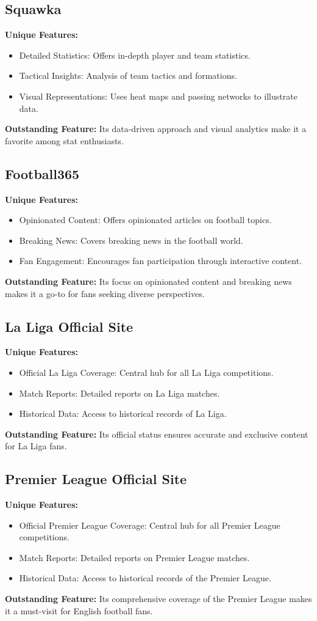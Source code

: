 \subsection{Squawka}
\textbf{Unique Features:}
\begin{itemize}
    \item Detailed Statistics: Offers in-depth player and team statistics.
    \item Tactical Insights: Analysis of team tactics and formations.
    \item Visual Representations: Uses heat maps and passing networks to illustrate data.
\end{itemize}
\textbf{Outstanding Feature:} Its data-driven approach and visual analytics make it a favorite among stat enthusiasts.

\subsection{Football365}
\textbf{Unique Features:}
\begin{itemize}
    \item Opinionated Content: Offers opinionated articles on football topics.
    \item Breaking News: Covers breaking news in the football world.
    \item Fan Engagement: Encourages fan participation through interactive content.
\end{itemize}
\textbf{Outstanding Feature:} Its focus on opinionated content and breaking news makes it a go-to for fans seeking diverse perspectives.

\subsection{La Liga Official Site}
\textbf{Unique Features:}
\begin{itemize}
    \item Official La Liga Coverage: Central hub for all La Liga competitions.
    \item Match Reports: Detailed reports on La Liga matches.
    \item Historical Data: Access to historical records of La Liga.
\end{itemize}
\textbf{Outstanding Feature:} Its official status ensures accurate and exclusive content for La Liga fans.

\subsection{Premier League Official Site}
\textbf{Unique Features:}
\begin{itemize}
    \item Official Premier League Coverage: Central hub for all Premier League competitions.
    \item Match Reports: Detailed reports on Premier League matches.
    \item Historical Data: Access to historical records of the Premier League.
\end{itemize}
\textbf{Outstanding Feature:} Its comprehensive coverage of the Premier League makes it a must-visit for English football fans.

